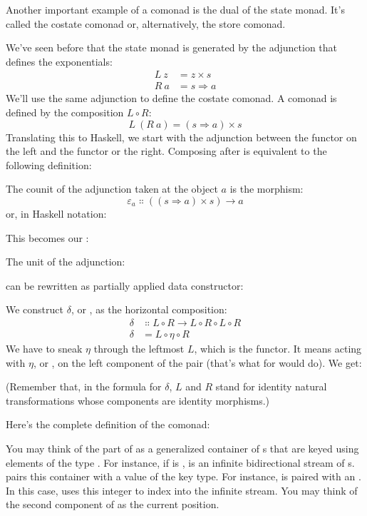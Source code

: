 Another important example of a comonad is the dual of the state monad.
It's called the costate comonad or, alternatively, the store comonad.

We've seen before that the state monad is generated by the adjunction
that defines the exponentials:
\begin{align*}
  L\ z & = z\times{}s      \\
  R\ a & = s \Rightarrow a
\end{align*}
We'll use the same adjunction to define the costate comonad. A comonad
is defined by the composition $L \circ R$:
\[L\ (R\ a) = (s \Rightarrow a)\times{}s\]
Translating this to Haskell, we start with the adjunction between the
 functor on the left and the  functor or the
right. Composing  after  is equivalent to
the following definition:

The counit of the adjunction taken at the object $a$ is the
morphism:
\[\varepsilon_a \Colon ((s \Rightarrow a)\times{}s) \to a\]
or, in Haskell notation:

This becomes our :

The unit of the adjunction:

can be rewritten as partially applied data constructor:

We construct $\delta$, or , as the horizontal composition:
\begin{align*}
  \delta & \Colon L \circ R \to L \circ R \circ L \circ R \\
  \delta & = L \circ \eta \circ R
\end{align*}
We have to sneak $\eta$ through the leftmost $L$, which is the
 functor. It means acting with $\eta$, or , on
the left component of the pair (that's what  for
 would do). We get:

(Remember that, in the formula for $\delta$, $L$ and $R$ stand
for identity natural transformations whose components are identity
morphisms.)

Here's the complete definition of the  comonad:

You may think of the  part of  as a
generalized container of s that are keyed using elements of
the type . For instance, if  is ,
 is an infinite bidirectional stream of
s.  pairs this container with a value of the key
type. For instance,  is paired with an
. In this case,  uses this integer to index
into the infinite stream. You may think of the second component of
 as the current position.

